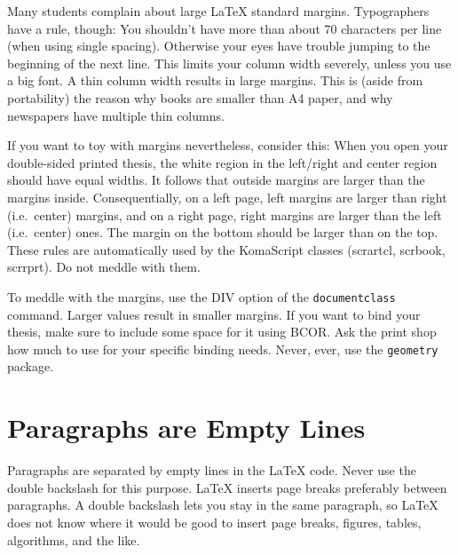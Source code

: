 \documentclass[8pt, %
a5paper, %
twoside, %
openright, %
abstract=off, %
DIV=11,      %
BCOR=8mm]{scrbook} %
\begin{document}
    Many students  complain  about  large  \LaTeX{}  standard  margins. 
    Typographers have a  rule, though: You shouldn't have  more than about 
    70 characters  per line (when  using single spacing).   Otherwise your 
    eyes have  trouble jumping to  the beginning  of the next  line.  This 
    limits  your column  width severely,  unless you  use a  big font.   A 
    thin  column width  results in  large  margins.  This  is (aside  from 
    portability) the reason  why books are smaller than A4  paper, and why 
    newspapers have multiple thin columns.                                 

    If  you want  to toy  with margins  nevertheless, consider  this: When 
    you  open  your  double-sided  printed thesis,  the  white  region  in 
    the  left/right  and  center  region should  have  equal  widths.   It 
    follows  that outside  margins  are larger  than  the margins  inside. 
    Consequentially, on  a left page,  left margins are larger  than right 
    (i.e.\ center) margins, and on a  right page, right margins are larger 
    than the left (i.e.\ center) ones. The  margin on the bottom should be 
    larger than  on the top.   These rules  are automatically used  by the 
    KomaScript classes  (scrartcl, scrbook, scrrprt).  Do  not meddle with 
    them.                                                                  
    
    To   meddle  with   the   margins,   use  the   DIV   option  of   the 
    \verb+documentclass+  command.    Larger  values  result   in  smaller 
    margins.  If you  want to bind your thesis, make  sure to include some 
    space for  it using BCOR\@.   Ask the print shop  how much to  use for 
    your  specific binding  needs.  Never,  ever, use  the \verb+geometry+ 
    package.                                                               

    \section{Paragraphs are Empty Lines}
    \label{sec:paras}

    Paragraphs are separated  by empty lines in the  \LaTeX{} code.  Never 
    use  the double  backslash for  this purpose.   \LaTeX{} inserts  page 
    breaks  preferably between  paragraphs.  A  double backslash  lets you 
    stay in the  same paragraph, so \LaTeX{} does not  know where it would 
    be good  to insert page  breaks, figures, tables, algorithms,  and the 
    like.                                                                  
\end{document}
